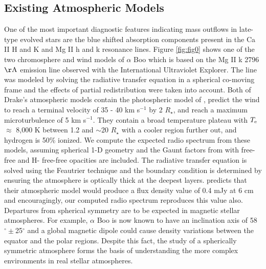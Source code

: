 \documentclass[iop]{emulateapj}
\begin{document}
\subsection{Existing Atmospheric Models} \label{disc2}
One of the most important diagnostic features indicating mass outflows in late-type evolved stars are the blue shifted absorption components present in the Ca II H and K and Mg II h and k resonance lines. Figure \ref{fig:fig0} shows one of the two chromosphere and wind models of $\alpha$ Boo \cite[`model A']{1985pssl.proc..351D} which is based on the Mg II k 2796 $\rm{\AA}$ emission line observed with the International Ultraviolet Explorer. The line was modeled by solving the radiative transfer equation in a spherical co-moving frame and the effects of partial redistribution \citep[e.g.,][]{1981BAICz..32..271H} were taken into account. Both of Drake's atmospheric models contain the photospheric model of \cite{1975ApJ...200..660A}, predict the wind to reach a terminal velocity of 35 - 40 km s${}^{-1}$ by 2 $R _{\star}$, and reach a maximum microturbulence of 5 km s$^{-1}$. They contain a broad temperature plateau with $T_{\rm{e}}$ $\approx$ 8,000 K between 1.2 and $\sim$20 $R _{\star}$ with a cooler region further out, and hydrogen is 50\% ionized. We compute the expected radio spectrum from these models, assuming spherical 1-D geometry and the Gaunt factors from \cite{1988ApJ...327..477H} with free-free and H- free-free opacities are included. The radiative transfer equation is solved using the Feautrier technique \cite[see, e.g.,][]{1994MNRAS.268..894H} and the boundary condition is determined by ensuring the atmosphere is optically thick at the deepest layers. \cite{1985pssl.proc..351D} predicts that their atmospheric model would produce a flux density value of 0.4 mJy at 6 cm and encouragingly, our computed radio spectrum reproduces this value also. Departures from spherical symmetry are to be expected in magnetic stellar atmospheres. For example, $\alpha$ Boo is now known to have an inclination axis of 58$^{\circ} \pm$25$^{\circ}$ \citep{2006PASP..118.1112G} and a global magnetic dipole could cause density variations between the equator and the polar regions. Despite this fact, the study of a  spherically symmetric atmosphere forms the basis of understanding the more complex environments in real stellar atmospheres.
\end{document}
